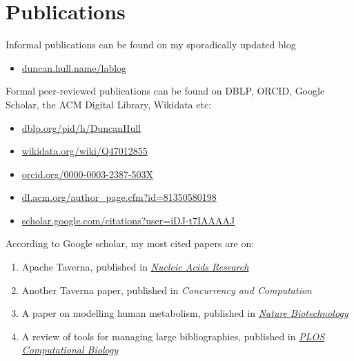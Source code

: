 \documentclass[
  12pt,
]{book}
\providecommand{\tightlist}{%
  \setlength{\itemsep}{0pt}\setlength{\parskip}{0pt}}
\begin{document}
\hypertarget{publications}{%
\section{Publications}\label{publications}}

Informal publications can be found on my sporadically updated blog

\begin{itemize}
\tightlist
\item
  \href{https://duncan.hull.name/lablog/}{duncan.hull.name/lablog}
\end{itemize}

Formal peer-reviewed publications can be found on DBLP, ORCID, Google Scholar, the ACM Digital Library, Wikidata etc:

\begin{itemize}
\tightlist
\item
  \href{https://dblp.org/pid/h/DuncanHull}{dblp.org/pid/h/DuncanHull}
\item
  \href{https://www.wikidata.org/wiki/Q47012855}{wikidata.org/wiki/Q47012855}
\item
  \href{https://orcid.org/0000-0003-2387-503X}{orcid.org/0000-0003-2387-503X}
\item
  \href{https://dl.acm.org/author_page.cfm?id=81350580198}{dl.acm.org/author\_page.cfm?id=81350580198}
\item
  \href{https://scholar.google.com/citations?user=iDJ-t7IAAAAJ}{scholar.google.com/citations?user=iDJ-t7IAAAAJ}
\end{itemize}

According to Google scholar, my most cited papers are on:

\begin{enumerate}
\def\labelenumi{\arabic{enumi}.}
\tightlist
\item
  Apache Taverna, published in \href{https://en.wikipedia.org/wiki/Nucleic_Acids_Research}{\emph{Nucleic Acids Research}} \citep{taverna}\\
\item
  Another Taverna paper, published in \emph{Concurrency and Computation} \citep{Oinn2006}\\
\item
  A paper on modelling human metabolism, published in \href{https://en.wikipedia.org/wiki/Nature_Biotechnology}{\emph{Nature Biotechnology}} \citep{Thiele2013}
\item
  A review of tools for managing large bibliographies, published in \href{https://en.wikipedia.org/wiki/PLOS_Computational_Biology}{\emph{PLOS Computational Biology}} \citep{defrosting}
\end{enumerate}
\end{document}
